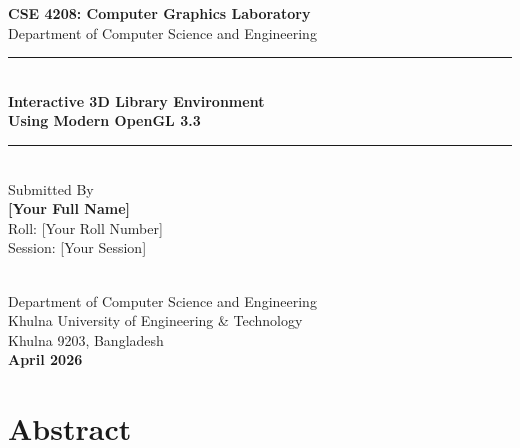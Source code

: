 \documentclass[12pt, a4paper]{article}
\begin{document}

\begin{titlepage}
    \centering
    \vspace*{1.2cm}
    {\large\bfseries CSE 4208: Computer Graphics Laboratory}\\[0.4cm]
    {\small Department of Computer Science and Engineering}\\[1.5cm]
    \rule{\linewidth}{1.5pt}\\[0.4cm]
    {\LARGE\bfseries Interactive 3D Library Environment\\[6pt]
     Using Modern OpenGL 3.3}\\[0.3cm]
    \rule{\linewidth}{1.5pt}\\[2.5cm]

    {\normalsize Submitted By}\\[8pt]
    {\Large\bfseries [Your Full Name]}\\[4pt]
    {\small Roll: [Your Roll Number]}\\[0.2cm]
    {\small Session: [Your Session]}\\[2.5cm]

    \\[2cm]

    {\normalsize
        Department of Computer Science and Engineering\\[4pt]
        Khulna University of Engineering \& Technology\\[4pt]
        Khulna 9203, Bangladesh\\[4pt]
        \textbf{April 2026}
    }
\end{titlepage}

\cleardoublepage
{}
\setcounter{page}{1}

\section{Abstract}
\end{document}
